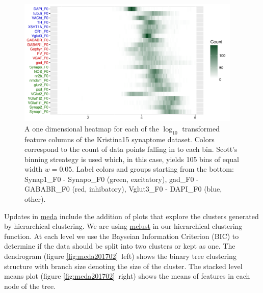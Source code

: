 \documentclass[simplex.tex]{subfiles}
\begin{document}
\begin{figure}[!h]
\begin{cframed}
\centering
\includegraphics[width=0.95\textwidth]{../../figs/201701-meda-1dheat.pdf}
\caption{A one dimensional heatmap for each of the $\log_{10}$
  transformed feature columns of the Kristina15 synaptome dataset.
  Colors correspond to the count of data points falling in to each bin.
  Scott's binning streategy is used which, in this case, yields 105 bins
  of equal width $w = 0.05$. 
  Label colors and groups starting from the bottom:
  \textcolor{jgreen}{Synap1\_F0 - Synapo\_F0 (green, excitatory)},
  \textcolor{jred}{gad\_F0 - GABABR\_F0 (red, inhibatory)},
  \textcolor{jblue}{Vglut3\_F0 - DAPI\_F0 (blue, other)}.
  }
\label{fig:meda201701}
\end{cframed}
\end{figure}

\clearpage


Updates in \href{https://github.com/neurodata/meda}{meda} include the
addition of plots that explore the clusters generated by
hierarchical clustering.  We are using 
\href{http://www.stat.washington.edu/fraley/mclust/}{mclust}
in our
hierarchical clustering function.  At each level we use the Bayseian
Information Criterion (BIC) to determine if the data should be split
into two clusters or kept as one.  The dendrogram 
(figure \ref{fig:meda201702}~left)
shows the binary tree clustering structure with branch size denoting the
size of the cluster.  The stacked level means plot
(figure \ref{fig:meda201702}~right) shows the means of features in each node 
of the tree.


\end{document}
